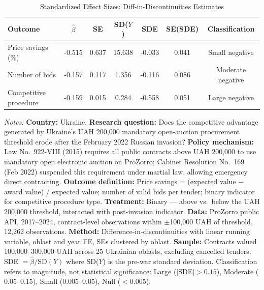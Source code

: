 \begin{table}[htbp]
\centering
\caption{Standardized Effect Sizes: Diff-in-Discontinuities Estimates}
\label{tab:sde}
\begin{tabular}{lcccccc}
\toprule
Outcome & $\hat{\beta}$ & SE & SD($Y$) & SDE & SE(SDE) & Classification \\
\midrule
Price savings (\%) & -0.515 & 0.637 & 15.638 & -0.033 & 0.041 & Small negative \\
Number of bids & -0.157 & 0.117 & 1.356 & -0.116 & 0.086 & Moderate negative \\
Competitive procedure & -0.159 & 0.015 & 0.284 & -0.558 & 0.051 & Large negative \\
\bottomrule
\end{tabular}
\begin{tablenotes}[flushleft]
\small
\item \textit{Notes:} \textbf{Country:} Ukraine. \textbf{Research question:} Does the competitive advantage generated by Ukraine's UAH 200,000 mandatory open-auction procurement threshold erode after the February 2022 Russian invasion? \textbf{Policy mechanism:} Law No.\ 922-VIII (2015) requires all public contracts above UAH 200,000 to use mandatory open electronic auction on ProZorro; Cabinet Resolution No.\ 169 (Feb 2022) suspended this requirement under martial law, allowing emergency direct contracting. \textbf{Outcome definition:} Price savings = (expected value $-$ award value) / expected value; number of valid bids per tender; binary indicator for competitive procedure type. \textbf{Treatment:} Binary --- above vs.\ below the UAH 200,000 threshold, interacted with post-invasion indicator. \textbf{Data:} ProZorro public API, 2017--2024, contract-level observations within $\pm$100,000 UAH of threshold, 12,262 observations. \textbf{Method:} Difference-in-discontinuities with linear running variable, oblast and year FE, SEs clustered by oblast. \textbf{Sample:} Contracts valued 100,000--300,000 UAH across 25 Ukrainian oblasts, excluding cancelled tenders. SDE $= \hat{\beta} / \text{SD}(Y)$ where SD($Y$) is the pre-war standard deviation. Classification refers to magnitude, not statistical significance: Large ($|$SDE$| > 0.15$), Moderate ($0.05$--$0.15$), Small ($0.005$--$0.05$), Null ($< 0.005$).
\end{tablenotes}
\end{table}
